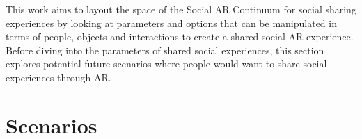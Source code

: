 

This work aims to layout the space of the Social AR Continuum for social sharing experiences by looking at parameters and options that can be manipulated in terms of people, objects and interactions to create a shared social AR experience. Before diving into the parameters of shared social experiences, this section explores potential future scenarios where people would want to share social experiences through AR.

\section{Scenarios}


